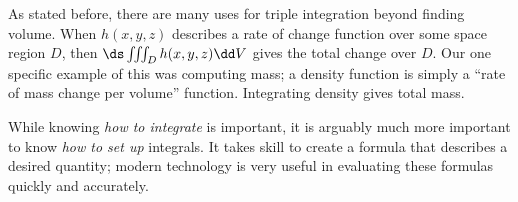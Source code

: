 As stated before, there are many uses for triple integration beyond finding volume. When $h(x,y,z)$ describes a rate of change function over some space region $D$, then $\ds \iiint_D h(x,y,z)\dd V$ gives the total change over $D$. Our one specific example of this was computing mass; a density function is simply a ``rate of mass change per volume'' function. Integrating density gives total mass.

While knowing \emph{how to integrate}  is important, it is arguably much more important to know \emph{how to set up} integrals. It takes skill to create a formula that describes a desired quantity; modern technology is very useful in evaluating these formulas quickly and accurately.

